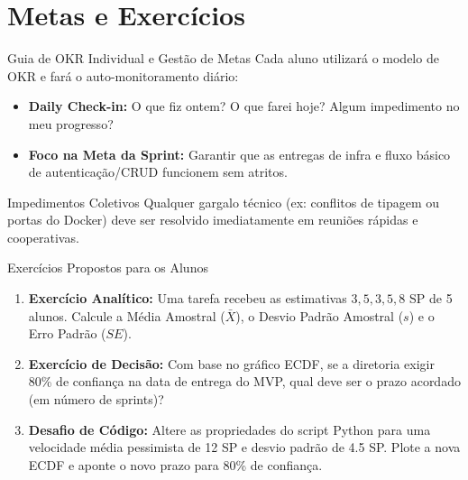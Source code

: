 \documentclass[10pt]{beamer}
\begin{document}
\section{Metas e Exercícios}
\begin{frame}{Guia de OKR Individual e Gestão de Metas}
    Cada aluno utilizará o modelo de OKR e fará o auto-monitoramento diário:
    \begin{itemize}
        \item \textbf{Daily Check-in:} O que fiz ontem? O que farei hoje? Algum impedimento no meu progresso?
        \item \textbf{Foco na Meta da Sprint:} Garantir que as entregas de infra e fluxo básico de autenticação/CRUD funcionem sem atritos.
    \end{itemize}
    \begin{alertblock}{Impedimentos Coletivos}
        Qualquer gargalo técnico (ex: conflitos de tipagem ou portas do Docker) deve ser resolvido imediatamente em reuniões rápidas e cooperativas.
    \end{alertblock}
\end{frame}

\begin{frame}{Exercícios Propostos para os Alunos}
    \begin{enumerate}
        \item \textbf{Exercício Analítico:} Uma tarefa recebeu as estimativas $3, 5, 3, 5, 8$ SP de 5 alunos. Calcule a Média Amostral ($\bar{X}$), o Desvio Padrão Amostral ($s$) e o Erro Padrão ($SE$).
        \item \textbf{Exercício de Decisão:} Com base no gráfico ECDF, se a diretoria exigir 80\% de confiança na data de entrega do MVP, qual deve ser o prazo acordado (em número de sprints)?
        \item \textbf{Desafio de Código:} Altere as propriedades do script Python para uma velocidade média pessimista de 12 SP e desvio padrão de 4.5 SP. Plote a nova ECDF e aponte o novo prazo para 80\% de confiança.
    \end{enumerate}
\end{frame}
\end{document}
